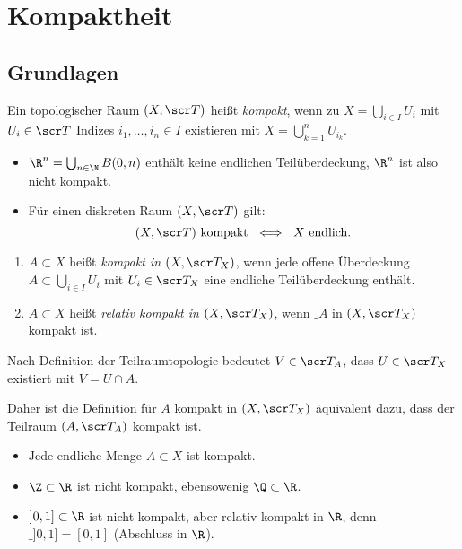 \chapter{Kompaktheit}



\section{Grundlagen}


\begin{df}
	Ein topologischer Raum $(X, \scr T)$ heißt \emph{kompakt}, wenn zu $X = \bigcup_{i\in I} U_i$ mit $U_i \in \scr T$ Indizes $i_1, \dotsc, i_n \in I$ existieren mit $X = \bigcup_{k=1}^n U_{i_k}$.
\end{df}

\begin{ex}
	\begin{itemize}
		\item
			$\R^n = \bigcup_{n\in\N} B(0,n)$ enthält keine endlichen Teilüberdeckung, $\R^n$ ist also nicht kompakt.
		\item
			Für einen diskreten Raum $(X, \scr T)$ gilt:
			\[
				(X, \scr T) \text{ kompakt }
				\iff
				\text{ $X$ endlich}.
			\]
	\end{itemize}
\end{ex}

\begin{df}
	\begin{enumerate}[(1)]
		\item
			$A \subset X$ heißt \emph{kompakt in $(X, \scr T_X)$}, wenn jede offene Überdeckung $A \subset \bigcup_{i\in I} U_i$ mit $U_i \in \scr T_X$ eine endliche Teilüberdeckung enthält.
		\item
			$A \subset X$ heißt \emph{relativ kompakt in $(X, \scr T_X)$}, wenn $\_A$ in $(X, \scr T_X)$ kompakt ist.
	\end{enumerate}
\end{df}

\begin{nt}
	Nach Definition der Teilraumtopologie %
	bedeutet $V \in \scr T_A$, dass $U \in \scr T_X$ existiert mit $V = U \cap A$.

	Daher ist die Definition für $A$ kompakt in $(X, \scr T_X)$ äquivalent dazu, dass der Teilraum $(A, \scr T_A)$ kompakt ist.
\end{nt}

\begin{ex}
	\begin{itemize}
		\item
			Jede endliche Menge $A \subset X$ ist kompakt.
		\item
			$\Z \subset \R$ ist nicht kompakt, ebensowenig $\Q \subset \R$.
		\item
			$]0,1] \subset \R$ ist nicht kompakt, aber relativ kompakt in $\R$, denn $\_{]0,1]} = [0,1]$ (Abschluss in $\R$).
	\end{itemize}
\end{ex}

